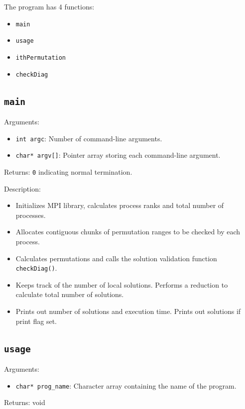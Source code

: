 \documentclass{article}
\begin{document}
The program has 4 functions:
\begin{itemize}
    \item \texttt{main}
    \item \texttt{usage}
    \item \texttt{ithPermutation}
    \item \texttt{checkDiag}
\end{itemize}

\subsection{\texttt{main}}
Arguments: 
    \begin{itemize}
	    \item \texttt{int argc}: Number of command-line arguments.
        \item \texttt{char* argv[]}: Pointer array storing each command-line 
        argument. 
    \end{itemize}
Returns: \texttt{0} indicating normal termination.

\medskip
\noindent
Description: 
\begin{itemize}
    \item Initializes MPI library, calculates process ranks and total number of 
    processes.

    \item Allocates contiguous chunks of permutation ranges to be checked by 
    each process.

    \item Calculates permutations and calls the solution validation function 
    \texttt{checkDiag()}.
    
    \item Keeps track of the number of local solutions. Performs a reduction to 
    calculate total number of solutions. 
    
    \item Prints out number of solutions and execution time. Prints out 
    solutions if print flag set.
\end{itemize}

\subsection{\texttt{usage}}
Arguments: 
    \begin{itemize}
	    \item \texttt{char* prog\_name}: Character array containing the name of 
	    the program.
    \end{itemize}
Returns: void
\end{document}
